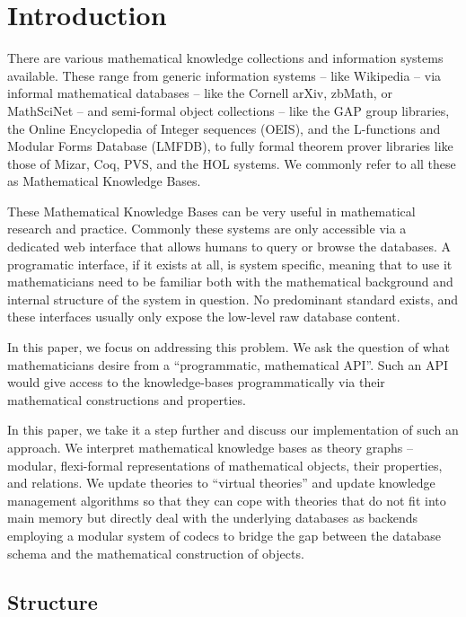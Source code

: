 \section{Introduction}\label{sec:intro}

There are various mathematical knowledge collections and information systems available. 
These range from generic information systems -- like Wikipedia -- via informal mathematical databases -- like the Cornell arXiv, zbMath, or MathSciNet -- and semi-formal object collections -- like the GAP group libraries, the Online Encyclopedia of Integer sequences (OEIS), and the L-functions and Modular Forms Database (LMFDB), to fully formal theorem prover libraries like those of Mizar, Coq, PVS, and the HOL systems. 
We commonly refer to all these as Mathematical Knowledge Bases. 

These Mathematical Knowledge Bases can be very useful in mathematical research and practice. 
Commonly these systems are only accessible via a dedicated web interface that allows humans to query or browse the databases. 
A programatic interface, if it exists at all, is system specific, meaning that to use it mathematicians need to be familiar both with the mathematical background and internal structure of the system in question. 
No predominant standard exists, and these interfaces usually only expose the low-level raw database content. 

In this paper, we focus on addressing this problem. 
We ask the question of what mathematicians desire from a ``programmatic, mathematical API''. 
Such an API would give access to the knowledge-bases programmatically via their mathematical constructions and properties. 

In this paper, we take it a step further and discuss our implementation of such an approach. 
We interpret mathematical knowledge bases as \ommt theory graphs -- modular, flexi-formal representations of mathematical objects, their properties, and relations. 
We update \ommt theories to ``virtual theories'' and update knowledge management algorithms so that they can cope with theories that do not fit into main memory but directly deal with the underlying databases as backends employing a modular system of codecs to bridge the gap between the database schema and the mathematical construction of objects.

\subsection*{Structure}\label{sec:intro:struct}

